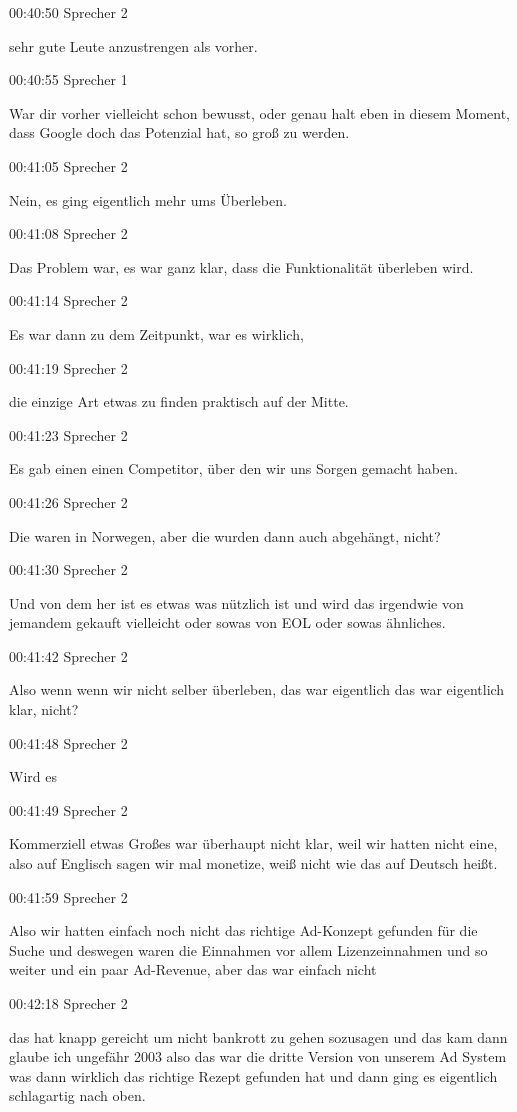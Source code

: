 00:40:50 Sprecher 2

sehr gute Leute anzustrengen als vorher.

00:40:55 Sprecher 1

War dir vorher vielleicht schon bewusst, oder genau halt eben in diesem
Moment, dass Google doch das Potenzial hat, so groß zu werden.

00:41:05 Sprecher 2

Nein, es ging eigentlich mehr ums Überleben.

00:41:08 Sprecher 2

Das Problem war, es war ganz klar, dass die Funktionalität überleben
wird.

00:41:14 Sprecher 2

Es war dann zu dem Zeitpunkt, war es wirklich,

00:41:19 Sprecher 2

die einzige Art etwas zu finden praktisch auf der Mitte.

00:41:23 Sprecher 2

Es gab einen einen Competitor, über den wir uns Sorgen gemacht haben.

00:41:26 Sprecher 2

Die waren in Norwegen, aber die wurden dann auch abgehängt, nicht?

00:41:30 Sprecher 2

Und von dem her ist es etwas was nützlich ist und wird das irgendwie von
jemandem gekauft vielleicht oder sowas von EOL oder sowas ähnliches.

00:41:42 Sprecher 2

Also wenn wenn wir nicht selber überleben, das war eigentlich das war
eigentlich klar, nicht?

00:41:48 Sprecher 2

Wird es

00:41:49 Sprecher 2

Kommerziell etwas Großes war überhaupt nicht klar, weil wir hatten nicht
eine, also auf Englisch sagen wir mal monetize, weiß nicht wie das auf
Deutsch heißt.

00:41:59 Sprecher 2

Also wir hatten einfach noch nicht das richtige Ad-Konzept gefunden für
die Suche und deswegen waren die Einnahmen vor allem Lizenzeinnahmen und
so weiter und ein paar Ad-Revenue, aber das war einfach nicht

00:42:18 Sprecher 2

das hat knapp gereicht um nicht bankrott zu gehen sozusagen und das kam
dann glaube ich ungefähr 2003 also das war die dritte Version von
unserem Ad System was dann wirklich das richtige Rezept gefunden hat und
dann ging es eigentlich schlagartig nach oben.

